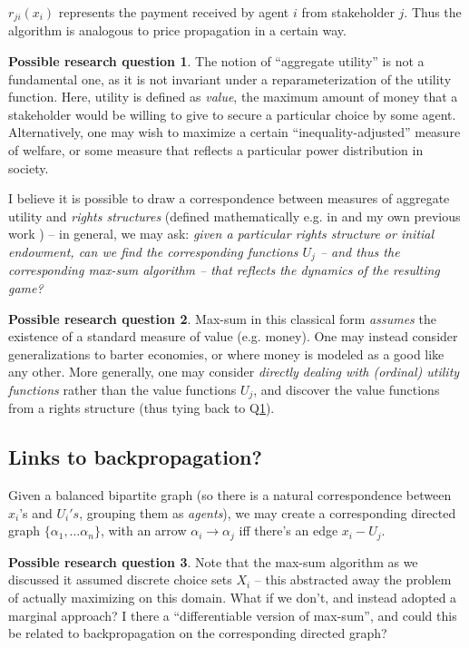 \documentclass{article}
\newcommand{\set}[1]{\ensuremath{\{ #1 \}}}
\theoremstyle{definition}
\newtheorem{question}{Possible research question}
\begin{document}
$r_{ji}(x_i)$ represents the payment received by agent $i$ from stakeholder $j$. Thus the algorithm is analogous to price propagation in a certain way.

\begin{question}
    The notion of ``aggregate utility'' is not a fundamental one, as it is not invariant under a reparameterization of the utility function. Here, utility is defined as \emph{value}, the maximum amount of money that a stakeholder would be willing to give to secure a particular choice by some agent. Alternatively, one may wish to maximize a certain ``inequality-adjusted'' measure of welfare, or some measure that reflects a particular power distribution in society. 
    
    I believe it is possible to draw a correspondence between measures of aggregate utility and \emph{rights structures} (defined mathematically e.g. in \cite{gardenfors} and my own previous work \cite{pasu}) -- in general, we may ask: \emph{given a particular rights structure or initial endowment, can we find the corresponding functions $U_j$ -- and thus the corresponding max-sum algorithm -- that reflects the dynamics of the resulting game?}
    \label{q:rights}
\end{question}

\begin{question}
    Max-sum in this classical form \emph{assumes} the existence of a standard measure of value (e.g. money). One may instead consider generalizations to barter economies, or where money is modeled as a good like any other. More generally, one may consider \emph{directly dealing with (ordinal) utility functions} rather than the value functions $U_j$, and discover the value functions from a rights structure (thus tying back to Q\ref{q:rights}). 
    \label{q:barter}
\end{question}

\subsection{Links to backpropagation?}

Given a balanced bipartite graph (so there is a natural correspondence between $x_i$'s and $U_i's$, grouping them as \emph{agents}), we may create a corresponding directed graph $\set{\alpha_1,\dots \alpha_n}$, with an arrow $\alpha_i\to\alpha_j$ iff there's an edge $x_i-U_j$. 

\begin{question}
    Note that the max-sum algorithm as we discussed it assumed discrete choice sets $X_i$ -- this abstracted away the problem of actually maximizing on this domain. What if we don't, and instead adopted a marginal approach? I there a ``differentiable version of max-sum'', and could this be related to backpropagation on the corresponding directed graph?
    \label{q:bp}
\end{question}
\end{document}
